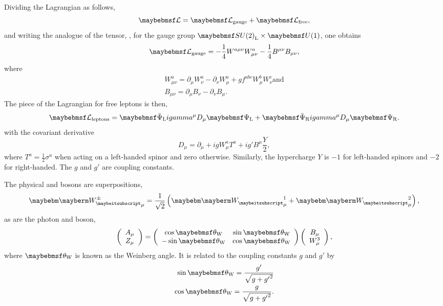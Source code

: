 Dividing the Lagrangian as follows,
\begin{equation*}
\lagrangiand = \lagrangiand_{\textrm{gauge}} + \lagrangiand_{\textrm{free}},
\end{equation*}
and writing the analogue of the tensor, \Fmunu, for the gauge group
$\SUtwo_{\textrm{L}}\times\Uone$, one obtains
\begin{equation*}
\lagrangiand_{\textrm{gauge}} = -\frac{1}{4} W^{a\mu\nu} W^a_{\mu\nu}
-\frac{1}{4} B^{\mu\nu}B_{\mu\nu},
\end{equation*}
where
\begin{eqnarray*}
W^{a}_{\mu\nu} = \partial_{\mu} W^a_{\nu} - \partial_{\nu}W^a_{\mu} + g f^{abc}
W^{b}_{\mu} W^c_{\nu} \textrm{and}\\
B_{\mu\nu} = \partial_{\mu} B_{\nu} - \partial_{\nu} B_{\mu}.
\end{eqnarray*}
The piece of the Lagrangian for free leptons is then,
\begin{equation*}
\lagrangiand_{\textrm{leptons}} = \APsiL i \gamma^{\mu} D_{\mu} \PsiL + \APsiR i
\gamma^{\mu} D_{\mu} \PsiR.
\end{equation*}
with the covariant derivative
\begin{equation*}
D_{\mu} = \partial_{\mu} + i g W^a_{\mu} T^a + i g' B^{\mu}\frac{Y}{2},
\end{equation*}
where $T^a = \frac{1}{2}\sigma^a$ when acting on a left-handed spinor and
zero otherwise. Similarly, the hypercharge $Y$ is $-1$ for left-handed spinors
and $-2$ for right-handed. The $g$ and $g'$ are coupling constants.

The physical \PWp and \PWm bosons are superpositions,
\begin{equation*}
\PWpm_{\mu} = \frac{1}{\sqrt{2}}\left(\PW^1_{\mu} + \PW^2_{\mu}\right),
\end{equation*}
as are the photon and \PZ boson,
\begin{equation*}
\left(\begin{array}{c}A_{\mu} \\ Z_{\mu} \end{array}\right ) =
  \left ( \begin{array}{cc} \cos\thetaw & \sin\thetaw \\ -\sin\thetaw &
      \cos\thetaw\end{array}\right)
\left ( \begin{array}{c} B_{\mu} \\ W^3_{\mu} \end{array} \right ),
\end{equation*}
where $\thetaw$ is known as the Weinberg angle. It is related to the coupling
constants $g$ and $g'$ by
\begin{eqnarray}
\sin\thetaw = \frac{g'}{\sqrt{g + {g'}^2}} \\
\cos\thetaw = \frac{g}{\sqrt{g + {g'}^2}}.
\end{eqnarray}

